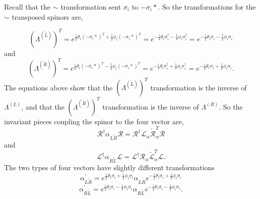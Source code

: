 Recall that the $\sim$ transformation sent $\sigma_i$ to $-\sigma_i*$. So the transformations for the $\sim$ transposed spinors are,

\begin{equation}
(\Lambda^{(\tilde{L})})^T = e^{\frac{i}{2}\theta_i(-\sigma_i*)^T + \frac{1}{2}\phi_i (-\sigma_i*)^T} 
= e^{-\frac{i}{2}\theta_i \sigma_i^\dagger - \frac{1}{2}\phi_i \sigma_i^\dagger} = e^{-\frac{i}{2}\theta_i \sigma_i - \frac{1}{2}\phi_i \sigma_i}
\end{equation}
and
\begin{equation}
(\Lambda^{(\tilde{R})})^T = e^{\frac{i}{2}\theta_i(-\sigma_i*)^T - \frac{1}{2}\phi_i (-\sigma_i*)^T} 
= e^{-\frac{i}{2}\theta_i \sigma_i^\dagger + \frac{1}{2}\phi_i \sigma_i^\dagger} = e^{-\frac{i}{2}\theta_i \sigma_i + \frac{1}{2}\phi_i \sigma_i}.
\end{equation}
The equations above show that the $(\Lambda^{(\tilde{L})})^T$ transformation is the inverse of $\Lambda^{(L)}$, and that the $(\Lambda^{(\tilde{R})})^T$ transformation is the inverse of $\Lambda^{(R)}$. So the invariant pieces coupling the spinor to the four vector are,
\begin{equation}
\mathcal{R}^\dagger \alpha_{L\tilde{R}} \mathcal{R} = \mathcal{R}^\dagger \mathcal{L}_\alpha \tilde{\mathcal{R}}_\alpha^{T} \mathcal{R}
\end{equation}
and
\begin{equation}
\mathcal{L}^\dagger \alpha_{R\tilde{L}} \mathcal{L} = \mathcal{L}^\dagger \mathcal{R}_\alpha \tilde{\mathcal{L}}_\alpha^{T} \mathcal{L}.
\end{equation}
The two types of four vectors have slightly different transformations
\begin{equation}
\alpha_{L\tilde{R}}^{'} = e^{\frac{i}{2}\theta_i \sigma_i + \frac{1}{2}\phi_i \sigma_i} 
\alpha_{L\tilde{R}} e^{-\frac{i}{2}\theta_i \sigma_i + \frac{1}{2}\phi_i \sigma_i}
\end{equation}
\begin{equation}
\alpha_{R\tilde{L}}^{'} = e^{\frac{i}{2}\theta_i \sigma_i - \frac{1}{2}\phi_i \sigma_i} 
\alpha_{R\tilde{L}} e^{-\frac{i}{2}\theta_i \sigma_i - \frac{1}{2}\phi_i \sigma_i}.
\end{equation}

